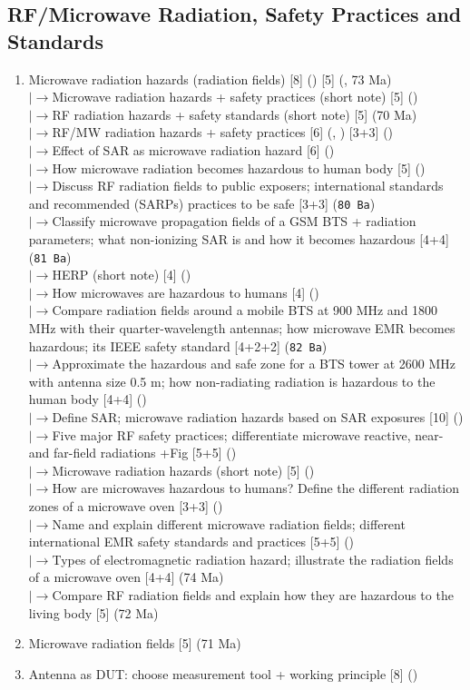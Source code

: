 \documentclass[12pt]{article}
\newcommand{\lb}{\\$\left|\rightarrow\right.$}
\begin{document}
  \subsection{RF/Microwave Radiation, Safety Practices and Standards}
    \begin{enumerate}[topsep=0pt, noitemsep]
      \item Microwave radiation hazards (radiation fields) \hfill [8] () [5] (, 73 Ma)
        \lb Microwave radiation hazards + safety practices (short note) \hfill [5] ()
        \lb RF radiation hazards + safety standards (short note) \hfill [5] (70 Ma)
        \lb RF/MW radiation hazards + safety practices \hfill [6] (, ) [3+3] ()
        \lb Effect of SAR as microwave radiation hazard \hfill [6] ()
        \lb How microwave radiation becomes hazardous to human body \hfill [5] ()
        \lb Discuss RF radiation fields to public exposers; international standards and recommended (SARPs) practices to be safe \hfill [3+3] (\texttt{80 Ba})
        \lb Classify microwave propagation fields of a GSM BTS + radiation parameters; what non-ionizing SAR is and how it becomes hazardous \hfill [4+4] (\texttt{81 Ba})
        \lb HERP (short note) \hfill [4] ()
        \lb How microwaves are hazardous to humans \hfill [4] ()
        \lb Compare radiation fields around a mobile BTS at 900 MHz and 1800 MHz with their quarter-wavelength antennas; how microwave EMR becomes hazardous; its IEEE safety standard \hfill [4+2+2] (\texttt{82 Ba})
        \lb Approximate the hazardous and safe zone for a BTS tower at 2600 MHz with antenna size 0.5 m; how non-radiating radiation is hazardous to the human body \hfill [4+4] ()
        \lb Define SAR; microwave radiation hazards based on SAR exposures \hfill [10] ()
        \lb Five major RF safety practices; differentiate microwave reactive, near- and far-field radiations +Fig \hfill [5+5] ()
        \lb Microwave radiation hazards (short note) \hfill [5] ()
        \lb How are microwaves hazardous to humans? Define the different radiation zones of a microwave oven \hfill [3+3] ()
        \lb Name and explain different microwave radiation fields; different international EMR safety standards and practices \hfill [5+5] ()
        \lb Types of electromagnetic radiation hazard; illustrate the radiation fields of a microwave oven \hfill [4+4] (74 Ma)
        \lb Compare RF radiation fields and explain how they are hazardous to the living body \hfill [5] (72 Ma)
      \item Microwave radiation fields \hfill [5] (71 Ma)
      \item Antenna as DUT: choose measurement tool + working principle \hfill [8] ()
    \end{enumerate}
\end{document}
